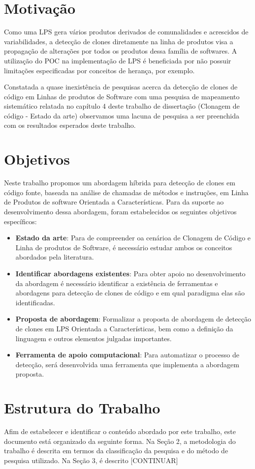 \section{Motivação}
Como uma LPS gera vários produtos derivados de comunalidades e acrescidos de variabilidades, a detecção de clones diretamente na linha de produtos visa a propagação de alterações por todos os produtos dessa família de softwares. A utilização do POC na implementação de LPS é beneficiada por não possuir limitações especificadas por conceitos de herança, por exemplo.

Constatada a quase inexistência de pesquisas acerca da detecção de clones de código em Linhas de produtos de Software com uma pesquisa de mapeamento sistemático relatada no capítulo 4 deste trabalho de dissertação (Clonagem de código - Estado da arte) observamos uma lacuna de pesquisa a ser preenchida com os resultados esperados deste trabalho.

\section{Objetivos}

Neste trabalho propomos um abordagem híbrida para detecção de clones em código fonte, baseada na análise de chamadas de métodos e instruções, em Linha de Produtos de software Orientada a Características. Para da suporte ao desenvolvimento dessa abordagem, foram estabelecidos os seguintes objetivos específicos:

\begin{itemize}
	\item \textbf{Estado da arte}: Para de compreender oa cenárioa de Clonagem de Código e Linha de produtos de Software, é necessário estudar ambos os conceitos abordados pela literatura.
	
	\item \textbf{Identificar abordagens existentes}: Para obter apoio no desenvolvimento da abordagem é necessário identificar a existência de ferramentas e abordagens para detecção de clones de código e em qual paradigma elas são identificadas.   
	
	\item \textbf{Proposta de abordagem}: Formalizar a proposta de abordagem de detecção de clones em LPS Orientada a Características, bem como a definição da linguagem e outros elementos julgadas importantes.
	
	\item \textbf{Ferramenta de apoio computacional}: Para automatizar o processo de detecção, será desenvolvida uma ferramenta que implementa a abordagem proposta.
	
\end{itemize}
 
\section{Estrutura do Trabalho}

Afim de estabelecer e identificar o conteúdo abordado por este trabalho, este documento está organizado da seguinte forma. Na Seção 2, a metodologia do trabalho é descrita em termos da classificação da pesquisa e do método de pesquisa utilizado. Na Seção 3, é descrito [CONTINUAR]


